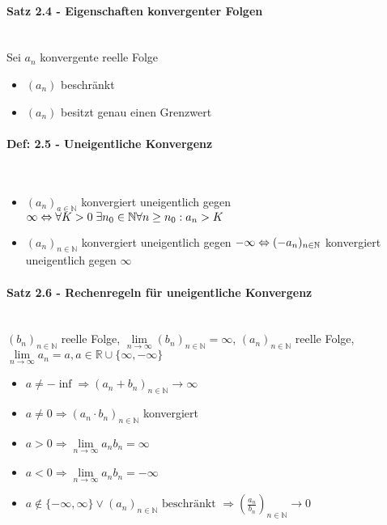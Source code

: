 \documentclass[paper=a3,paper=landscape, fontsize=9pt,DIV=30]{scrartcl}
\newcommand{\real}{{\mathbb{R}}}
\newcommand{\nat}{\mathbb{N}}
\newcommand{\aseq}{(a_n)_{n \in \nat}}
\begin{document}
\begin{multicols*}{4}
  \paragraph{Satz 2.4 - Eigenschaften konvergenter Folgen}\hspace{0pt} \\
  Sei $a_n$ konvergente reelle Folge
  \begin{itemize}
  \item $(a_n)$ beschränkt
  \item $(a_n)$ besitzt genau einen Grenzwert
  \end{itemize}


  \paragraph{Def: 2.5 - Uneigentliche Konvergenz}\hspace{0pt} \\
  \begin{itemize}
  	\item $(a_n)_{a \in \nat}$ konvergiert uneigentlich gegen $\infty \Leftrightarrow\\\forall K > 0 \; \exists n_0 \in \nat \forall n \geq n_0: a_n > K$
  	\item  $\aseq$ konvergiert uneigentlich gegen $-\infty \Leftrightarrow\\ (-a_n)_{n \in \nat}$ konvergiert uneigentlich gegen $\infty$
  \end{itemize}

  \paragraph{Satz 2.6 - Rechenregeln für uneigentliche Konvergenz}\hspace{0pt} \\
  $(b_n)_{n \in \nat}$ reelle Folge, $\lim\limits_{n \rightarrow \infty} (b_n)_{n \in \nat} = \infty$, $\aseq$ reelle Folge, $\lim\limits_{n \rightarrow \infty} a_n = a, a \in \real \cup \{\infty, -\infty\}$

  \begin{itemize}
  \item $a \neq -\inf \Rightarrow (a_n+b_n)_{n \in \nat} \rightarrow \infty$
  \item $a \neq 0 \Rightarrow (a_n \cdot b_n)_{n \in \nat}$ konvergiert
  \item $a > 0 \Rightarrow \lim\limits_{n \rightarrow \infty} a_nb_n = \infty$
  \item $a < 0 \Rightarrow \lim\limits_{n \rightarrow \infty} a_nb_n = -\infty$
  \item $a \notin \{-\infty, \infty\} \vee\aseq \text{ beschränkt } \Rightarrow (\frac{a_n}{b_n})_{n \in \nat} \rightarrow 0$
  \end{itemize}


\end{multicols*}
\end{document}
